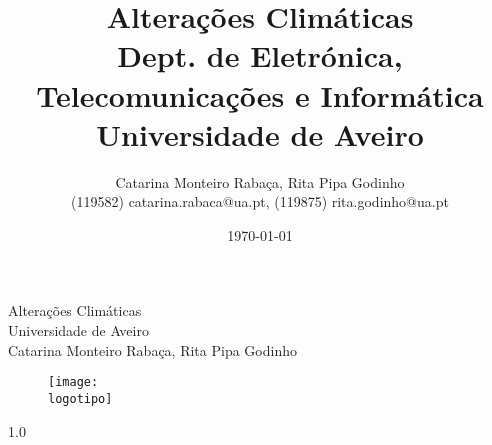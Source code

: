 \documentclass{report}
\begin{document}
%
\def\titulo{Alterações Climáticas}
\def\data{11/11/2023}
\def\autores{Catarina Monteiro Rabaça, Rita Pipa Godinho}
\def\autorescontactos{(119582) catarina.rabaca@ua.pt, (119875) rita.godinho@ua.pt}
\def\versao{1.0}
\def\departamento{Dept. de Eletrónica, Telecomunicações e Informática}
\def\empresa{Universidade de Aveiro}
\def\logotipo{ua.pdf}
%
%
\begin{titlepage}

\begin{center}
%
\vspace*{50mm}
%
{\Huge \titulo}\\ 
%
\vspace{10mm}
%
{\Large \empresa}\\
%
\vspace{10mm}
%
{\LARGE \autores}\\ 
%
\vspace{30mm}
%
\begin{figure}[h]
\center
\texttt{[image: \\logotipo]}
\end{figure}
%
\vspace{30mm}
\end{center}
%
\begin{flushright}
\versao
\end{flushright}
\end{titlepage}

\title{%
{\Huge\textbf{\titulo}}\\
{\Large \departamento\\ \empresa}
}
%
\author{%
    \autores \\
    \autorescontactos
}
%
\date{\today}
%
\maketitle

\end{document}
